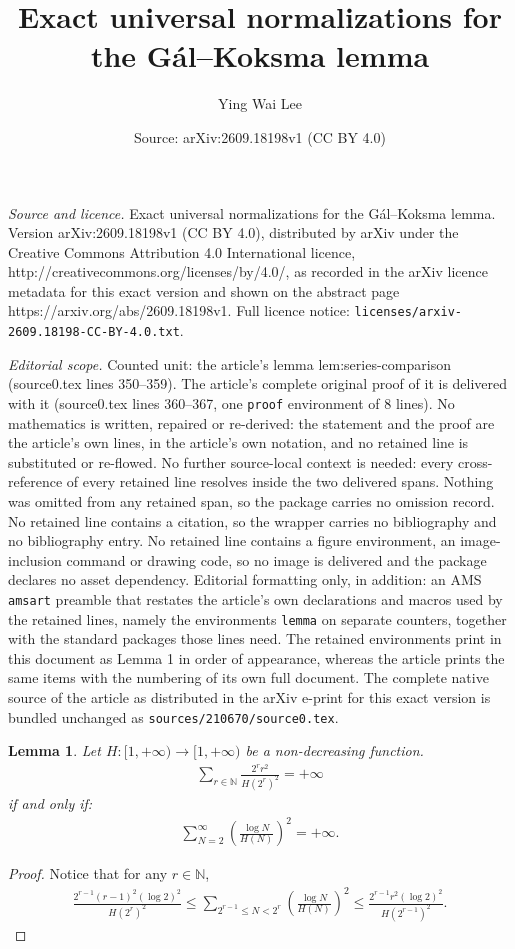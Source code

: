 \documentclass[10pt,a4paper]{amsart}
\title{Exact universal normalizations for the G\'al--Koksma lemma}
\author{Ying Wai Lee}
\date{Source: arXiv:2609.18198v1 (CC BY 4.0)}
\newtheorem{lemma}{Lemma}
\begin{document}
\maketitle

\noindent\emph{Source and licence.} Exact universal normalizations for the G\'al--Koksma lemma. Version arXiv:2609.18198v1 (CC BY 4.0), distributed by arXiv under the Creative Commons Attribution 4.0 International licence, http://creativecommons.org/licenses/by/4.0/, as recorded in the arXiv licence metadata for this exact version and shown on the abstract page https://arxiv.org/abs/2609.18198v1. Full licence notice: \texttt{licenses/arxiv-2609.18198-CC-BY-4.0.txt}.\par\smallskip

\noindent\textit{Editorial scope.} Counted unit: the article's lemma lem:series-comparison (source0.tex lines 350--359). The article's complete original proof of it is delivered with it (source0.tex lines 360--367, one \texttt{proof} environment of 8 lines). No mathematics is written, repaired or re-derived: the statement and the proof are the article's own lines, in the article's own notation, and no retained line is substituted or re-flowed.  No further source-local context is needed: every cross-reference of every retained line resolves inside the two delivered spans.  Nothing was omitted from any retained span, so the package carries no omission record.  No retained line contains a citation, so the wrapper carries no bibliography and no bibliography entry.  No retained line contains a figure environment, an image-inclusion command or drawing code, so no image is delivered and the package declares no asset dependency.  Editorial formatting only, in addition: an AMS \texttt{amsart} preamble that restates the article's own declarations and macros used by the retained lines, namely the environments \texttt{lemma} on separate counters, together with the standard packages those lines need.  The retained environments print in this document as Lemma 1 in order of appearance, whereas the article prints the same items with the numbering of its own full document.  The complete native source of the article as distributed in the arXiv e-print for this exact version is bundled unchanged as \texttt{sources/210670/source0.tex}.
\begin{lemma}\label{lem:series-comparison}
Let $H:[1,+\infty)\to[1,+\infty)$ be a non-decreasing function.
\begin{align*}
    \sum_{r\in\mathbb{N}}\frac{2^r r^2}{H(2^r)^2}=+\infty
\end{align*}
if and only if:
\begin{align*}
    \sum_{N=2}^{\infty}\left(\frac{\log{N}}{H(N)}\right)^2=+\infty.
\end{align*}
\end{lemma}

\begin{proof}
Notice that for any $r\in\mathbb{N}$,
\begin{align*}
    \frac{2^{r-1}(r-1)^2(\log2)^2}{H(2^r)^2}
    \leq \sum_{2^{r-1}\leq N<2^r}\left(\frac{\log{N}}{H(N)}\right)^2
    \leq \frac{2^{r-1}r^2(\log2)^2}{H(2^{r-1})^2}.
\end{align*}
\end{proof}
\end{document}
